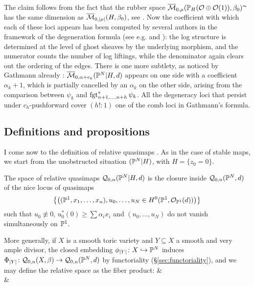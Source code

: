 \begin{rmk}
 The claim follows from the fact that the rubber space $\overline{\mathcal{M}}_{0,\mu}(\mathbb P_H(\mathcal{O}\oplus\mathcal{O}(1)),\beta_0)^\thicksim$ has the same dimension as $\overline{\mathcal{M}}_{0,\lvert\mu\rvert}(H,\beta_0)$, see \cite[\S 2.4]{GraberVakil}. Now the coefficient with which each of these loci appears has been computed by several authors in the framework of the degeneration formula (see e.g. \cite[Remark 6.3.1.2]{KimLog} and \cite[Equation (1.7)]{KLR}):  the log structure is determined at the level of ghost sheaves by the underlying morphism, and the numerator counts the number of log liftings, while the denominator again clears out the ordering of the edges. There is one more subtlety, as noticed by Gathmann already \cite[Corollary 3.5]{Ga}: $\overline{\mathcal{M}}_{0,\alpha+e_k}(\mathbb P^N|H,d)$ appears on one side with a coefficient $\alpha_k+1$, which is partially cancelled by an $\alpha_k$ on the other side, arising from the comparison between $\psi_k$ and $\operatorname{fgt}_{n+1,\ldots,n+h}^*\psi_k$. All the degeneracy loci that persist under $c_h$-pushforward cover $(h!:1)$ one of the comb loci in Gathmann's formula.
\end{rmk}

\subsection{Definitions and propositions}
I come now to the definition of relative quasimaps \cite[\S 2.3]{BN}. As in the case of stable maps, we start from the unobstructed situation $(\mathbb P^N|H)$, with $H=\{z_0=0\}$.

\begin{definition}
 The space of relative quasimaps $\mathcal{Q}_{0,\alpha}(\mathbb P^N|H,d)$ is the closure inside $\mathcal{Q}_{0,n}(\mathbb P^N,d)$ of the nice locus of quasimaps \[\left\{\left((\mathbb P^1,x_1,\ldots,x_n),u_0,\ldots,u_N\in H^0(\mathbb P^1,\mathcal{O}_{\mathbb P^1}(d))\right)\right\}\] such that $u_0\nequiv 0$, $u_0^*(0)\geq\sum\alpha_ix_i$ and $(u_0,\ldots,u_N)$ do not vanish simultaneously on $\mathbb P^1$.
 
 More generally, if $X$ is a smooth toric variety and $Y\subseteq X$ a smooth and very ample divisor, the closed embedding $\phi_{\lvert Y\rvert}\colon X\hookrightarrow \mathbb P^N$ induces $\Phi_{\lvert Y\rvert}\colon \mathcal{Q}_{0,n}(X,\beta)\rightarrow \mathcal{Q}_{0,n}(\mathbb P^N,d)$ by functoriality (\S \ref{sec:functoriality}), and we may define the relative space as the fiber product:
\bcd
{}\ar[d]\ar[r,hook] &  \\
 \ar[r,hook] & 
\ecd
\end{definition}

